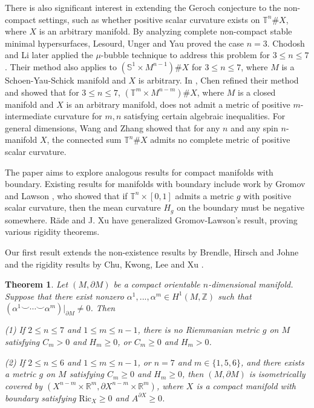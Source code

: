 \documentclass[11pt,letterpaper]{amsart}
\newtheorem{theorem}{Theorem}[section]
\theoremstyle{definition}
\theoremstyle{remark}
\numberwithin{equation}{section}
\begin{document}
There is also significant interest in extending the Geroch conjecture to the non-compact settings, such as whether positive scalar curvature exists on $\mathbb{T}^{n}\# X$, where $X$ is an arbitrary manifold. By analyzing complete non-compact stable minimal hypersurfaces, Lesourd, Unger and Yau \cite{Lesourd-Unger-Yau} proved the case $n = 3$.  Chodosh and Li \cite{chodoshlisoapbubble} later applied the $\mu$-bubble technique to address this problem for $3\leq n\leq 7$. Their method also applies to $(\mathbb{S}^{1}\times M^{n-1})\# X$ for $3 \leq n \leq 7$, where $M$ is a Schoen-Yau-Schick manifold and $X$ is arbitrary. In \cite{chenshuli_end}, Chen refined their method and showed that for $3\leq n\leq 7$, $(\mathbb{T}^{m}\times M^{n-m})\# X$, where $M$ is a closed manifold and $X$ is an arbitrary manifold, does not admit a metric of positive $m$-intermediate curvature for  $m,n$ satisfying certain algebraic inequalities. For general dimensions, Wang and Zhang \cite{Wang-Zhang-geroch} showed that for any $n$ and any spin $n$-manifold $X$, the connected sum $\mathbb{T}^{n}\#X$ admits no complete metric of positive scalar curvature. 

The paper aims to explore analogous results for compact manifolds with boundary. 
Existing results for manifolds with boundary include work by Gromov and Lawson \cite{Gromov-Lawson-ann}, who showed that if $\mathbb{T}^{n}\times [0,1]$ admits a metric $g$ with positive scalar curvature, then the mean curvature $H_{g}$ on the boundary must be negative somewhere. R\"ade \cite{Rade} and J. Xu \cite{xu2025scalarmeancurvaturecomparison} have generalized Gromov-Lawson's result, proving various rigidity theorems.

Our first result extends the non-existence results by Brendle, Hirsch and Johne \cite{brendlegeroch'sconjecture} and the  rigidity results by Chu, Kwong, Lee \cite{ChuKwongLeerigidity} and Xu \cite{XuTrans}.
\begin{theorem}\label{main theorem 1 Introduction}
    Let $(M,\partial M)$ be a compact orientable $n$-dimensional manifold. Suppose that there exist nonzero $  \alpha^{1},...,\alpha^{m}\in H^{1}(M,\mathbb{Z})$ such that %
    $(\alpha^{1}\smile\cdots\smile \alpha^{m})|_{\partial M}\neq 0$. Then

    (1) If $2\leq n\leq 7$ and $1\leq m\leq n-1$, there is no Riemmanian metric $g$ on $M$ satisfying $C_{m}> 0$ and $H_{m}\geq 0$, or $C_{m}\geq 0$ and $H_{m}> 0$.  

    (2) If $2\leq n\leq 6$ and $1\leq m\leq n-1$, or $n=7$ and $m\in \{1,5,6\}$, and there exists a metric $g$ on $M$ satisfying $C_{m}\geq 0$ and $H_{m}\geq 0$, then $(M,\partial M)$ is isometrically covered by $(X^{n-m}\times \mathbb{R}^{m},\partial X^{n-m}\times \mathbb{R}^{m})$, where $X$ is a compact manifold with boundary satisfying $\text{Ric}_{X}\geq 0$ and $A^{\partial X}\geq 0$.
\end{theorem}
\end{document}
